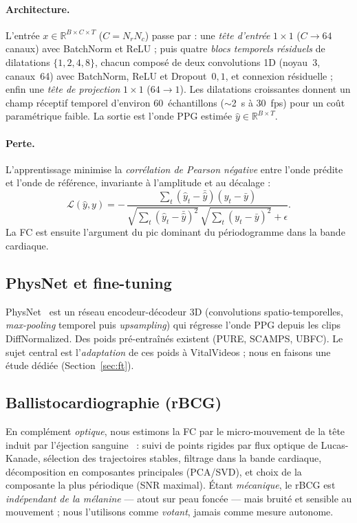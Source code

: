 \documentclass[11pt]{article}
\begin{document}
\paragraph{Architecture.} L'entrée $x \in \mathbb{R}^{B\times C\times T}$ ($C = N_r
N_c$) passe par : une \emph{tête d'entrée} $1\times1$ ($C \to 64$ canaux) avec
BatchNorm et ReLU ; puis quatre \emph{blocs temporels résiduels} de dilatations
$\{1,2,4,8\}$, chacun composé de deux convolutions 1D (noyau~3, canaux~64) avec
BatchNorm, ReLU et Dropout~$0{,}1$, et connexion résiduelle ; enfin une \emph{tête de
projection} $1\times1$ ($64 \to 1$). Les dilatations croissantes donnent un champ
réceptif temporel d'environ 60~échantillons ($\sim$2~s à 30~fps) pour un coût
paramétrique faible. La sortie est l'onde PPG estimée $\hat{y} \in \mathbb{R}^{B\times
T}$.

\paragraph{Perte.} L'apprentissage minimise la \emph{corrélation de Pearson négative}
entre l'onde prédite et l'onde de référence, invariante à l'amplitude et au décalage :
\begin{equation}
\mathcal{L}(\hat{y}, y) = -\,
\frac{\sum_t (\hat{y}_t - \bar{\hat y})(y_t - \bar y)}
{\sqrt{\sum_t (\hat{y}_t - \bar{\hat y})^2}\,\sqrt{\sum_t (y_t - \bar y)^2} + \epsilon}.
\end{equation}
La FC est ensuite l'argument du pic dominant du périodogramme dans la bande
cardiaque.

\subsection{PhysNet et fine-tuning}
\label{sec:physnet}
PhysNet~\cite{yu2019} est un réseau encodeur-décodeur 3D (convolutions
spatio-temporelles, \emph{max-pooling} temporel puis \emph{upsampling}) qui régresse
l'onde PPG depuis les clips DiffNormalized. Des poids pré-entraînés existent (PURE,
SCAMPS, UBFC). Le sujet central est l'\emph{adaptation} de ces poids à VitalVideos ;
nous en faisons une étude dédiée (Section~\ref{sec:ft}).

\subsection{Ballistocardiographie (rBCG)}
En complément \emph{optique}, nous estimons la FC par le micro-mouvement de la tête
induit par l'éjection sanguine~\cite{balakrishnan2013} : suivi de points rigides par
flux optique de Lucas-Kanade, sélection des trajectoires stables, filtrage dans la
bande cardiaque, décomposition en composantes principales (PCA/SVD), et choix de la
composante la plus périodique (SNR maximal). Étant \emph{mécanique}, le rBCG est
\emph{indépendant de la mélanine} --- atout sur peau foncée --- mais bruité et
sensible au mouvement ; nous l'utilisons comme \emph{votant}, jamais comme mesure
autonome.
\end{document}
